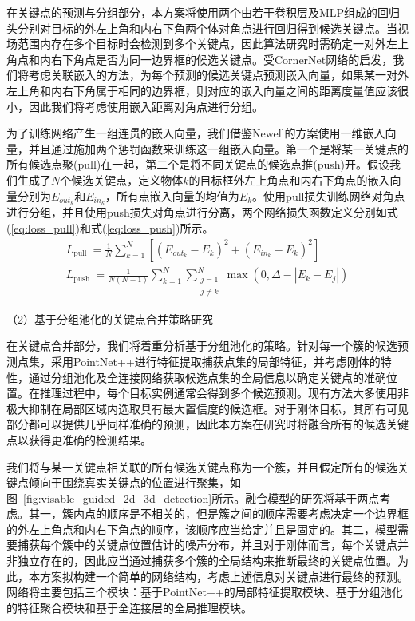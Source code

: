 \documentclass[12pt]{article}
\begin{document}
在关键点的预测与分组部分，本方案将使用两个由若干卷积层及MLP组成的回归头分别对目标的外左上角和内右下角两个体对角点进行回归得到候选关键点。当视场范围内存在多个目标时会检测到多个关键点，因此算法研究时需确定一对外左上角点和内右下角点是否为同一边界框的候选关键点。受CornerNet网络的启发，我们将考虑关联嵌入的方法，为每个预测的候选关键点预测嵌入向量，如果某一对外左上角和内右下角属于相同的边界框，则对应的嵌入向量之间的距离度量值应该很小，因此我们将考虑使用嵌入距离对角点进行分组。

为了训练网络产生一组连贯的嵌入向量，我们借鉴Newell\cite{Newell2017}的方案使用一维嵌入向量，并且通过施加两个惩罚函数来训练这一组嵌入向量。第一个是将某一关键点的所有候选点聚(pull)在一起，第二个是将不同关键点的候选点推(push)开。假设我们生成了$N$个候选关键点，定义物体$k$的目标框外左上角点和内右下角点的嵌入向量分别为$E_{out_k}$和$E_{in_k}$，所有点嵌入向量的均值为$E_k$。使用pull损失训练网络对角点进行分组，并且使用push损失对角点进行分离，两个网络损失函数定义分别如式(\ref{eq:loss_pull})和式(\ref{eq:loss_push})所示。
\begin{gather}
L_{\text {pull }}=\frac{1}{N} \sum_{k=1}^N\left[\left(E_{out_k}-E_k\right)^2+\left(E_{in_k}-E_k\right)^2\right] 
\label{eq:loss_pull}
\\
L_{\text {push }}=\frac{1}{N(N-1)} \sum_{k=1}^N \sum_{\substack{j=1 \\
j \neq k}}^N \max \left(0, \Delta -\left|E_k-E_j\right|\right)
\label{eq:loss_push}
\end{gather}

（2）基于分组池化的关键点合并策略研究

在关键点合并部分，我们将着重分析基于分组池化的策略。针对每一个簇的候选预测点集，采用PointNet++进行特征提取捕获点集的局部特征，并考虑刚体的特性，通过分组池化及全连接网络获取候选点集的全局信息以确定关键点的准确位置。在推理过程中，每个目标实例通常会得到多个候选预测。现有方法大多使用非极大抑制在局部区域内选取具有最大置信度的候选框。对于刚体目标，其所有可见部分都可以提供几乎同样准确的预测，因此本方案在研究时将融合所有的候选关键点以获得更准确的检测结果。

我们将与某一关键点相关联的所有候选关键点称为一个簇，并且假定所有的候选关键点倾向于围绕真实关键点的位置进行聚集，如图~\ref{fig:visable_guided_2d_3d_detection}所示。融合模型的研究将基于两点考虑。其一，簇内点的顺序是不相关的，但是簇之间的顺序需要考虑决定一个边界框的外左上角点和内右下角点的顺序，该顺序应当给定并且是固定的。其二，模型需要捕获每个簇中的关键点位置估计的噪声分布，并且对于刚体而言，每个关键点并非独立存在的，因此应当通过捕获多个簇的全局结构来推断最终的关键点位置。为此，本方案拟构建一个简单的网络结构，考虑上述信息对关键点进行最终的预测。网络将主要包括三个模块：基于PointNet++的局部特征提取模块、基于分组池化的特征聚合模块和基于全连接层的全局推理模块。
\end{document}
